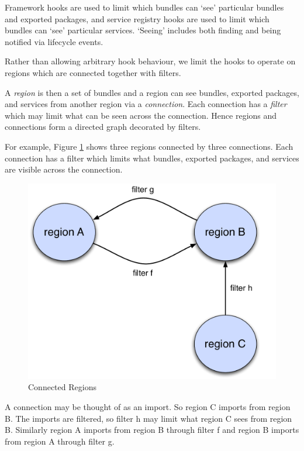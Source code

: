 \documentclass[a4paper,9pt,twoside]{article}
\begin{document}
Framework hooks are used to limit which bundles can `see' particular bundles
and exported packages, and service registry hooks are used to limit which bundles
can `see' particular services. `Seeing' includes both finding and being notified via lifecycle events.

Rather than allowing arbitrary hook behaviour, we limit the hooks to operate on regions
which are connected together with filters.

A \textit{region} is then a set of bundles and a region can see bundles, exported packages, and services
from another region via a \textit{connection}. Each connection has a \textit{filter} which may limit
what can be seen across the connection.
Hence regions and connections form a directed graph decorated by filters.

For example, Figure \ref{fig:conn} shows three regions connected by three connections.
Each connection has a filter which limits what bundles, exported packages, and services
are visible across the connection.

\begin{figure}[h!]
\begin{center}
\includegraphics*[scale=0.35]{connected-regions.pdf}
\caption{Connected Regions}
\end{center}
\label{fig:conn}
\end{figure}

A connection may be thought of as an import. So region C imports from region B.
The imports are filtered, so filter h may limit what region C sees from region B.
Similarly region A imports from region B through filter f and region B imports from region A through
filter g.
\end{document}
